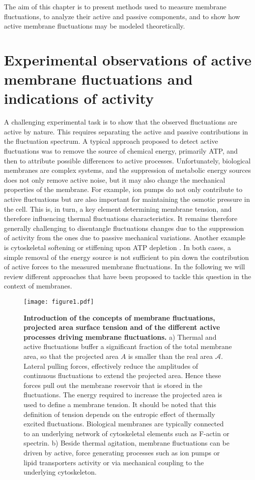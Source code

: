 \documentclass[graybox]{svmult}
\begin{document}
The aim of this chapter is to present methods used to measure membrane fluctuations, to analyze their active and passive components, and to show how active membrane fluctuations may be modeled theoretically. 

\section{Experimental observations of active membrane fluctuations and indications of activity}
A challenging experimental task is to show that the observed fluctuations are active by nature. This requires separating the active and passive contributions in the fluctuation spectrum. A typical approach proposed to detect active fluctuations was to remove the source of chemical energy, primarily ATP, and then to attribute possible differences to active processes. Unfortunately, biological membranes are complex systems, and the suppression of metabolic energy sources does not only remove active noise, but it may also change the mechanical properties of the membrane. For example, ion pumps do not only contribute to active fluctuations but are also important for maintaining the osmotic pressure in the cell. This is, in turn, a key element determining membrane tension, and therefore influencing thermal fluctuations characteristics. It remains therefore generally challenging to disentangle fluctuations changes due to the suppression of activity from the ones due to passive mechanical variations. Another example is cytoskeletal softening or stiffening upon ATP depletion \cite{Humphrey_2002, Koenderink_2009}. In both cases, a simple removal of the energy source is not sufficient to pin down the contribution of active forces to the measured membrane fluctuations. In the following we will review different approaches that have been proposed to tackle this question in the context of membranes. 

\begin{figure}
	\centering
		\texttt{[image: figure1.pdf]}
	\caption{\textbf{Introduction of the concepts of membrane fluctuations, projected area surface tension and of the different active processes driving membrane fluctuations.} a) Thermal and active fluctuations buffer a significant fraction of the total membrane area, so that the projected area $A$ is smaller than the real area $\mathcal{A}$. Lateral pulling forces, effectively reduce the amplitudes of continuous fluctuations to extend the projected area. Hence these forces pull out the membrane reservoir that is stored in the fluctuations. The energy required to increase the projected area is used to define a membrane tension. It should be noted that this definition of tension depends on the entropic effect of thermally excited fluctuations. Biological membranes are typically connected to an underlying network of cytoskeletal elements such as F-actin or spectrin. b) Beside thermal agitation, membrane fluctuations can be driven by active, force generating processes such as ion pumps or lipid transporters activity or via mechanical coupling to the underlying cytoskeleton.}
	\label{fig:fig1}
\end{figure}
\end{document}
